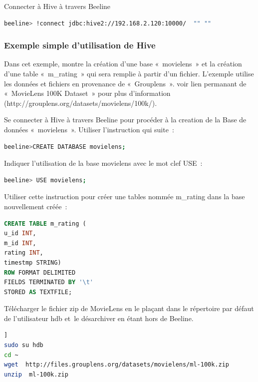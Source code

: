 \documentclass[12pt,english]{book}
\begin{document}
Connecter à Hive à travers Beeline

\begin{lstlisting}[language=bash, frame=single]
beeline> !connect jdbc:hive2://192.168.2.120:10000/  "" ""
\end{lstlisting}

\subsubsection{Exemple simple d’utilisation de Hive}

Dans cet exemple, montre la création d’une base « movielens » et la création d’une table « m\_rating » qui sera remplie à partir d’un fichier.
L’exemple utilise les données et fichiers en provenance de « Grouplens ».
voir lien permanant de « MovieLens 100K Dataset » pour plus d’information (http://grouplens.org/datasets/movielens/100k/). 

Se connecter à Hive à travers Beeline pour procéder à la creation de la Base de données « movielens ». Utiliser l’instruction qui suite :

\begin{lstlisting}[language=bash, frame=single]
beeline>CREATE DATABASE movielens;
\end{lstlisting}

Indiquer l’utilisation de la base movielens avec le mot clef USE :

\begin{lstlisting}[language=bash, frame=single]
beeline> USE movielens;
\end{lstlisting}

Utiliser cette instruction pour créer une tables nommée m\_rating dans la base nouvellement créée :

\begin{lstlisting}[language=SQL, frame=single]
CREATE TABLE m_rating (
u_id INT,
m_id INT,
rating INT,
timestmp STRING)
ROW FORMAT DELIMITED 
FIELDS TERMINATED BY '\t'
STORED AS TEXTFILE;
\end{lstlisting}

Télécharger le fichier zip de MovieLens en le plaçant dans le répertoire par défaut de l’utilisateur hdb et le désarchiver en étant hors de Beeline.  

\begin{lstlisting}[language=bash, frame=single, breaklines=true, postbreak=\mbox{\textcolor{red}{$\hookrightarrow$}\space}]]
sudo su hdb
cd ~
wget  http://files.grouplens.org/datasets/movielens/ml-100k.zip
unzip  ml-100k.zip
\end{lstlisting}
\end{document}
